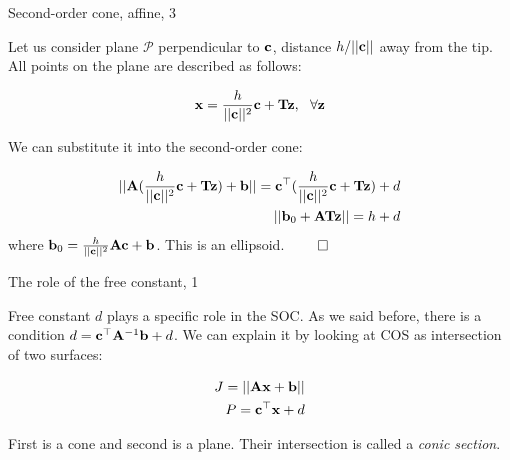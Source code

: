 \documentclass{beamer}
\begin{document}
\begin{frame}{Second-order cone, affine, 3}
	\begin{flushleft}
		
		Let us consider plane $\mathcal P$ perpendicular to $\mathbf{c}$, distance  $h / ||\mathbf{c}||$ away from the tip. All points on the plane are described as follows:
		
		\begin{align}
			\bo{x} = \frac{h}{||\bo{c}||^2} \bo{c} + \bo{T} \bo{z}, \ \ \forall \bo{z}
		\end{align}
		
		We can substitute it into the second-order cone:
		
		\begin{align}
			||\mathbf{A}(\frac{h}{||\mathbf{c}||^2} \mathbf{c} + \mathbf{T} \mathbf{z})+\mathbf{b}|| = \mathbf{c}^\top (\frac{h}{||\mathbf{c}||^2} \mathbf{c} + \mathbf{T} \mathbf{z}) + d
			\\
			||\mathbf{b}_0+\mathbf{A}\mathbf{T} \mathbf{z}|| = h + d
		\end{align}
			where $\mathbf{b}_0 = \frac{h}{||\mathbf{c}||^2} \mathbf{A} \mathbf{c}+\mathbf{b}$. This is an ellipsoid. $\qed$
	
		
	\end{flushleft}
\end{frame}




\begin{frame}{The role of the free constant, 1}
	\begin{flushleft}
		
		Free constant $d$ plays a specific role in the SOC. As we said before, there is a condition $d = \mathbf{c}^\top \mathbf{A}^{-1}\mathbf{b} + d$. We can explain it by looking at COS as intersection of two surfaces: 
		
		\begin{align}
			J = ||\mathbf{A}\mathbf{x}+\mathbf{b}|| \\
			P = \mathbf{c}^\top \mathbf{x} + d
		\end{align}
		
		First is a cone and second is a plane. Their intersection is called a \emph{conic section}. 
				
	\end{flushleft}
\end{frame}
\end{document}
